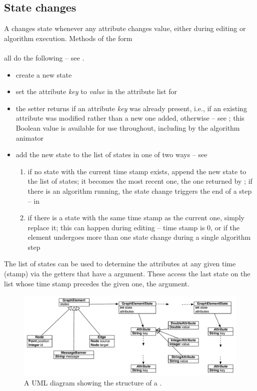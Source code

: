 \subsection{State changes}

A  changes state whenever any attribute changes value,
either during editing or algorithm execution. Methods of the form\\
\\
all do the following -- see .
\begin{itemize}
\item create a new state 
\item set the attribute \emph{key} to \emph{value} in the attribute list for
\item the setter returns  if an attribute \emph{key} was already
  present, i.e., if an existing attribute was modified rather than a new one
  added,  otherwise -- see ; this Boolean
  value is available for use throughout, including by the algorithm animator
\item add the new state to the list of states in one of two ways -- see
  \begin{enumerate}
    \item if no state with the current time stamp exists, append the new
      state to the list of states; it becomes the most recent one, the one
      returned by ; if there is an algorithm running, the
      state change triggers the end of a step --
       in 
    \item if there is a state with the same time stamp as the current one,
      simply replace it; this can happen during editing -- time stamp is 0,
      or if the element undergoes more than one state change during a single
      algorithm step
  \end{enumerate}
\end{itemize}
The list of states can be used to determine the attributes at any given time
(stamp) via the getters that have a  argument. These access the
last state on the list whose time stamp precedes the given one, the
 argument.

\begin{figure}
  \begin{center}
    \includegraphics[width=\textwidth]{Developer/X-graph_uml}
  \end{center}
  \caption{A UML diagram showing the structure of a .}
  \label{fig:graph_uml}
\end{figure}

